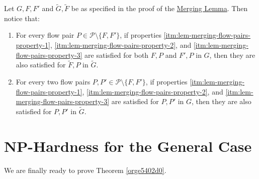 \documentclass[fontsize=11pt,paper=a4]{book}
\begin{document}
\begin{remark}
Let \(G,F,F'\) and \(\tilde{G},\tilde{F}\) be as specified in the proof of the \hyperref[orgf9b0f0c]{Merging Lemma}.
Then notice that:

\begin{enumerate}
\item \label{itm:remark-merging-flow-pairs-1}
For every flow pair \(P\in\mathcal{P}\setminus\{F,F'\}\), if properties \ref{itm:lem-merging-flow-pairs-property-1}, \ref{itm:lem-merging-flow-pairs-property-2}, and \ref{itm:lem-merging-flow-pairs-property-3} are satisfied for both \(F,P\) and \(F',P\) in \(G\), then they are also satisfied for \(\tilde{F},P\) in \(\tilde{G}\).

\item \label{itm:remark-merging-flow-pairs-2}
For every two flow pairs \(P,P'\in\mathcal{P}\setminus\{F,F'\}\), if properties \ref{itm:lem-merging-flow-pairs-property-1}, \ref{itm:lem-merging-flow-pairs-property-2}, and \ref{itm:lem-merging-flow-pairs-property-3} are satisfied for \(P,P'\) in \(G\), then they are also satisfied for \(P,P'\) in \(\tilde{G}\).
\end{enumerate}
\label{orgd9a599d}
\end{remark}

\chapter{\(\textbf{NP}\)-Hardness for the General Case}
\label{sec:orgd059137}

We are finally ready to prove Theorem \ref{orge5402d0}.
\end{document}
